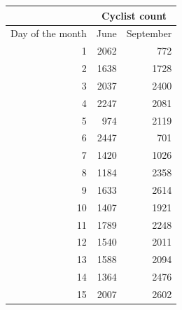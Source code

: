 \begin{table}[]
\centering
\begin{tabular}{|r|r|r|}
\hline
\multicolumn{1}{|l|}{}                 & \multicolumn{2}{c|}{Cyclist count}                         \\ \hline
\multicolumn{1}{|l|}{Day of the month} & \multicolumn{1}{l|}{June} & \multicolumn{1}{l|}{September} \\ \hline
1                                      & 2062                      & 772                            \\ \hline
2                                      & 1638                      & 1728                           \\ \hline
3                                      & 2037                      & 2400                           \\ \hline
4                                      & 2247                      & 2081                           \\ \hline
5                                      & 974                       & 2119                           \\ \hline
6                                      & 2447                      & 701                            \\ \hline
7                                      & 1420                      & 1026                           \\ \hline
8                                      & 1184                      & 2358                           \\ \hline
9                                      & 1633                      & 2614                           \\ \hline
10                                     & 1407                      & 1921                           \\ \hline
11                                     & 1789                      & 2248                           \\ \hline
12                                     & 1540                      & 2011                           \\ \hline
13                                     & 1588                      & 2094                           \\ \hline
14                                     & 1364                      & 2476                           \\ \hline
15                                     & 2007                      & 2602                           \\ \hline

\end{tabular}
\end{table}
